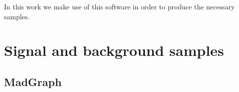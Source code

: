 In this work we make use of this software in order to produce the necessary samples.

%

\section{Signal and background samples}
\label{sec:sig+bkg}


\subsection{MadGraph}

